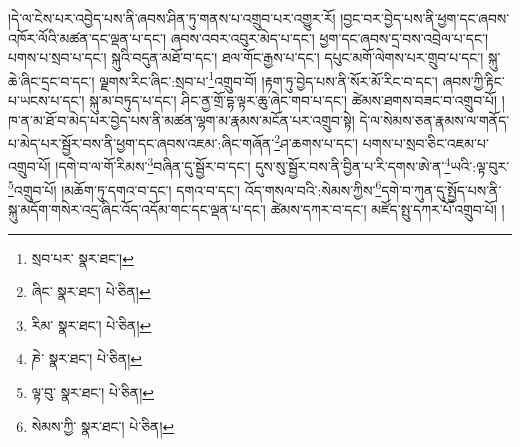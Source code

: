 །དེ་ལ་ངེས་པར་འབྱེད་པས་ནི་ཞབས་ཤིན་ཏུ་གནས་པ་འགྲུབ་པར་འགྱུར་རོ། །བྱང་བར་བྱེད་པས་ནི་ཕྱག་དང་ཞབས་འཁོར་ལོའི་མཚན་དང་ལྡན་པ་དང་། ཞབས་འབར་འབུར་མེད་པ་དང་། ཕྱག་དང་ཞབས་དྲ་བས་འབྲེལ་པ་དང་། པགས་པ་སྲབ་པ་དང་། སྐུའི་བདུན་མཐོ་བ་དང་། ཐལ་གོང་རྒྱས་པ་དང་། དཔུང་མགོ་ལེགས་པར་གྲུབ་པ་དང་། སྐུ་ཆེ་ཞིང་དྲང་བ་དང་། ལྗགས་རིང་ཞིང་:སྲབ་པ་\footnote{སྲབ་པར་  སྣར་ཐང་། }འགྲུབ་བོ། །རྟག་ཏུ་བྱེད་པས་ནི་སོར་མོ་རིང་བ་དང་། ཞབས་ཀྱི་རྟིང་པ་ཡངས་པ་དང་། སྐུ་མ་བཏུད་པ་དང་། ཤིང་ནྱ་གྲོ་དྷ་ལྟར་ཆུ་ཞེང་གབ་པ་དང་། ཚེམས་ཐགས་བཟང་བ་འགྲུབ་པོ། །ཁ་ན་མ་ཐོ་བ་མེད་པར་བྱེད་པས་ནི་མཚན་ལྷག་མ་རྣམས་མངོན་པར་འགྲུབ་སྟེ། དེ་ལ་སེམས་ཅན་རྣམས་ལ་གནོད་པ་མེད་པར་སྦྱོར་བས་ནི་ཕྱག་དང་ཞབས་འཇམ་:ཞིང་གཞོན་\footnote{ཞིང་  སྣར་ཐང་།  པེ་ཅིན། }ཤ་ཆགས་པ་དང་། པགས་པ་སྲབ་ཅིང་འཇམ་པ་འགྲུབ་པོ། །དགེ་བ་ལ་གོ་རིམས་\footnote{རིམ་  སྣར་ཐང་།  པེ་ཅིན། }བཞིན་དུ་སྦྱོར་བ་དང་། དུས་སུ་སྦྱོར་བས་ནི་བྱིན་པ་རི་དགས་ཨེ་ན་\footnote{ཎེ་  སྣར་ཐང་།  པེ་ཅིན། }ཡའི་:ལྟ་བུར་\footnote{ལྟ་བུ་  སྣར་ཐང་།  པེ་ཅིན། }འགྲུབ་པོ། །མཆོག་ཏུ་དགའ་བ་དང་། དགའ་བ་དང་། འོད་གསལ་བའི་:སེམས་ཀྱིས་\footnote{སེམས་ཀྱི་  སྣར་ཐང་།  པེ་ཅིན། }དགེ་བ་ཀུན་དུ་སྤྱོད་པས་ནི་སྐུ་མདོག་གསེར་འདྲ་ཞིང་འོད་འདོམ་གང་དང་ལྡན་པ་དང་། ཚེམས་དཀར་བ་དང་། མཛོད་སྤུ་དཀར་པོ་འགྲུབ་པོ། །
